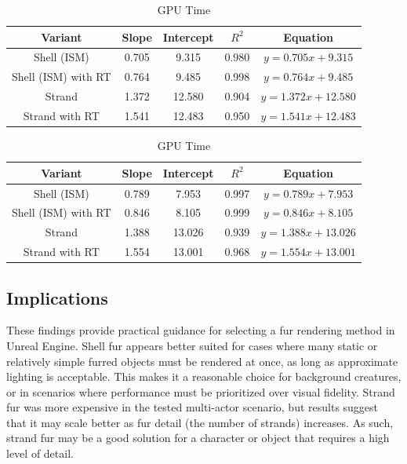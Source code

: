 \documentclass{article}
\begin{document}
\begin{table}[htbp]
\caption{Multiple-Sphere Test Linear Fit Results}
\label{table:spheres-fit}
\centering

\begin{subtable}{\linewidth}
\centering
\caption{Frame Time}
\label{table:spheres-fit-ft}
\begin{tabular}{c c c c c}
\hline\hline
Variant & Slope & Intercept & $R^2$ & Equation \\ [0.5ex]
\hline
Shell (ISM) & 0.705 & 9.315 & 0.980 & $y = 0.705x + 9.315$ \\
Shell (ISM) with RT & 0.764 & 9.485 & 0.998 & $y = 0.764x + 9.485$ \\
Strand & 1.372 & 12.580 & 0.904 & $y = 1.372x + 12.580$ \\
Strand with RT & 1.541 & 12.483 & 0.950 & $y = 1.541x + 12.483$ \\ [1ex]
\hline
\end{tabular}
\end{subtable}

\vspace{1em}

\begin{subtable}{\linewidth}
\centering
\caption{GPU Time}
\label{table:spheres-fit-gpu}
\begin{tabular}{c c c c c}
\hline\hline
Variant & Slope & Intercept & $R^2$ & Equation \\ [0.5ex]
\hline
Shell (ISM) & 0.789 & 7.953 & 0.997 & $y = 0.789x + 7.953$ \\
Shell (ISM) with RT & 0.846 & 8.105 & 0.999 & $y = 0.846x + 8.105$ \\
Strand & 1.388 & 13.026 & 0.939 & $y = 1.388x + 13.026$ \\
Strand with RT & 1.554 & 13.001 & 0.968 & $y = 1.554x + 13.001$ \\ [1ex]
\hline
\end{tabular}
\end{subtable}
\end{table}

\subsection{Implications}

These findings provide practical guidance for selecting a fur rendering method in Unreal Engine. Shell fur appears better suited for cases where many static or relatively simple furred objects must be rendered at once, as long as approximate lighting is acceptable. This makes it a reasonable choice for background creatures, or in scenarios where performance must be prioritized over visual fidelity. Strand fur was more expensive in the tested multi-actor scenario, but results suggest that it may scale better as fur detail (the number of strands) increases. As such, strand fur may be a good solution for a character or object that requires a high level of detail.
\end{document}

